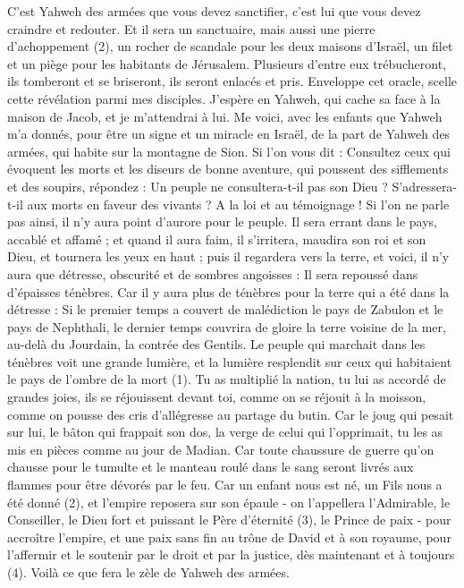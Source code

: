 \begin{multicols}{2}
C’est Yahweh des armées que vous devez sanctifier, c’est lui que vous devez craindre et redouter.
Et il sera un sanctuaire, mais aussi une pierre d'achoppement (2), un rocher de scandale pour les deux maisons d'Israël, un filet et un piège pour les habitants de Jérusalem.
Plusieurs d’entre eux trébucheront, ils tomberont et se briseront, ils seront enlacés et pris.
Enveloppe cet oracle, scelle cette révélation parmi mes disciples.
J’espère en Yahweh, qui cache sa face à la maison de Jacob, et je m'attendrai à lui.
Me voici, avec les enfants que Yahweh m'a donnés, pour être un signe et un miracle en Israël, de la part de Yahweh des armées, qui habite sur la montagne de Sion.
Si l’on vous dit : Consultez ceux qui évoquent les morts et les diseurs de bonne aventure, qui poussent des sifflements et des soupirs, répondez : Un peuple ne consultera-t-il pas son Dieu ? S’adressera-t-il aux morts en faveur des vivants ?
A la loi et au témoignage ! Si l’on ne parle pas ainsi, il n’y aura point d’aurore pour le peuple.
Il sera errant dans le pays, accablé et affamé ; et quand il aura faim, il s’irritera, maudira son roi et son Dieu, et tournera les yeux en haut ;
puis il regardera vers la terre, et voici, il n’y aura que détresse, obscurité et de sombres angoisses : Il sera repoussé dans d’épaisses ténèbres.
Car il y aura plus de ténèbres pour la terre qui a été dans la détresse : Si le premier temps a couvert de malédiction le pays de Zabulon et le pays de Nephthali, le dernier temps couvrira de gloire la terre voisine de la mer, au-delà du Jourdain, la contrée des Gentils.
\VerseOne{}Le peuple qui marchait dans les ténèbres voit une grande lumière, et la lumière resplendit sur ceux qui habitaient le pays de l'ombre de la mort (1).
Tu as multiplié la nation, tu lui as accordé de grandes joies, ils se réjouissent devant toi, comme on se réjouit à la moisson, comme on pousse des cris d’allégresse au partage du butin.
Car le joug qui pesait sur lui, le bâton qui frappait son dos, la verge de celui qui l’opprimait, tu les as mis en pièces comme au jour de Madian.
Car toute chaussure de guerre qu’on chausse pour le tumulte et le manteau roulé dans le sang seront livrés aux flammes pour être dévorés par le feu.
Car un enfant nous est né, un Fils nous a été donné (2), et l'empire reposera sur son épaule - on l’appellera l'Admirable, le Conseiller, le Dieu fort et puissant le Père d'éternité (3), le Prince de paix -
pour accroître l’empire, et une paix sans fin au trône de David et à son royaume, pour l'affermir et le soutenir par le droit et par la justice, dès maintenant et à toujours (4). Voilà ce que fera le zèle de Yahweh des armées.

\end{multicols}
